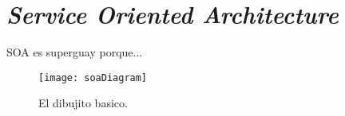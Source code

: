 

\chapter{\textit{Service Oriented Architecture}}
\label{cap:p2pcompt}


SOA es superguay porque...

\begin{figure}[htbp]
\centerline{\texttt{[image: soaDiagram]}}
\caption{El dibujito basico.}
\label{fig:spontaneous}
\end{figure}



